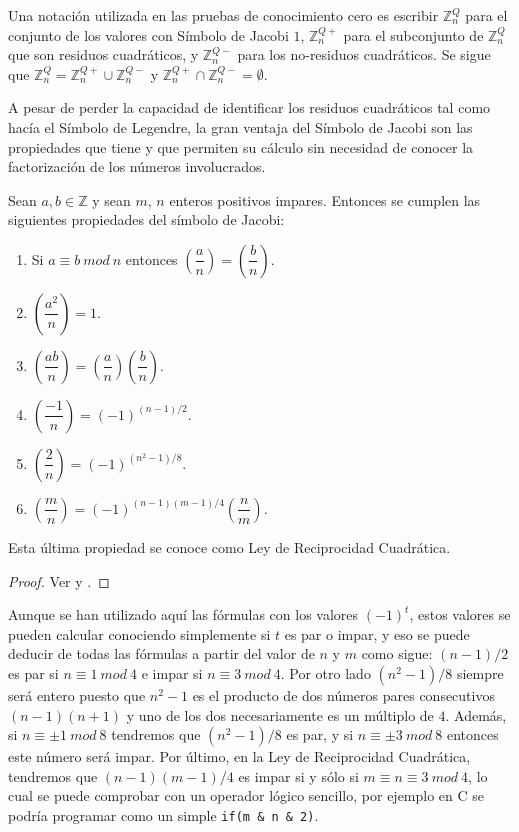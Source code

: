 \begin{remark}
	Una notaci\'on utilizada en las pruebas de conocimiento cero es escribir $\mathbb{Z}_n^Q$ para el conjunto de los valores con S\'imbolo de Jacobi $1$, $\mathbb{Z}_n^{Q+}$ para el subconjunto de $\mathbb{Z}_n^Q$ que son residuos cuadr\'aticos, y  $\mathbb{Z}_n^{Q-}$ para los no-residuos cuadr\'aticos. Se sigue que $\mathbb{Z}_n^Q = \mathbb{Z}_n^{Q+} \cup \mathbb{Z}_n^{Q-}$ y $\mathbb{Z}_n^{Q+} \cap \mathbb{Z}_n^{Q-} = \emptyset $.
\end{remark}

A pesar de perder la capacidad de identificar los residuos cuadr\'aticos tal como hacía el S\'imbolo de Legendre, la gran ventaja del S\'imbolo de Jacobi son las
propiedades que tiene y que permiten su c\'alculo sin necesidad de conocer la factorizaci\'on de los n\'umeros involucrados.

\begin{proposition}
Sean $a,b \in {\mathbb Z}$ y sean $m$, $n$ enteros positivos impares. Entonces se cumplen las siguientes propiedades del s\'imbolo de Jacobi:
\begin{enumerate}
\item Si $a\equiv b~mod~n$ entonces $\left( \dfrac{a}{n} \right) = \left( \dfrac{b}{n} \right)$.
\item $\left( \dfrac{a^2}{n} \right) = 1$.
\item $\left( \dfrac{ab}{n} \right) = \left( \dfrac{a}{n} \right)\left( \dfrac{b}{n} \right)$.
\item $\left( \dfrac{-1}{n} \right) = (-1)^{(n-1)/2}$.
\item $\left( \dfrac{2}{n} \right) = (-1)^{(n^2-1)/8}$.
\item $\left( \dfrac{m}{n} \right) = (-1)^{(n-1)(m-1)/4} \left( \dfrac{n}{m} \right)$.
\end{enumerate}
Esta \'ultima propiedad se conoce como Ley de Reciprocidad Cuadr\'atica.
\end{proposition}
\begin{proof}
Ver \cite[Proposition 2.13]{Pardo} y \cite[Theorem 2.24]{Pardo}.
\end{proof}

\begin{remark}
Aunque se han utilizado aqu\'i las f\'ormulas con los valores $(-1)^t$, estos valores se pueden calcular conociendo simplemente si $t$ es par o impar, y eso se puede deducir
de todas las f\'ormulas a partir del valor de $n$ y $m$ como sigue: $(n-1)/2$ es par si $n \equiv 1~mod~4$ e impar si $n \equiv 3~mod~4$. Por otro lado $(n^2-1)/8$ siempre ser\'a
entero puesto que $n^2-1$ es el producto de dos n\'umeros pares consecutivos $(n-1)(n+1)$ y uno de los dos necesariamente es un m\'ultiplo de $4$. Adem\'as, si $n \equiv \pm 1~mod~8$
tendremos que $(n^2-1)/8$ es par, y si $n \equiv \pm 3 ~mod~ 8$ entonces este n\'umero ser\'a impar. Por \'ultimo, en la Ley de Reciprocidad Cuadr\'atica, tendremos que $(n-1)(m-1)/4$ es
impar si y s\'olo si $m \equiv n \equiv 3 ~mod~4$, lo cual se puede comprobar con un operador l\'ogico sencillo, por ejemplo en C se podr\'ia programar como un simple \verb!if(m & n & 2)!.
\end{remark}

